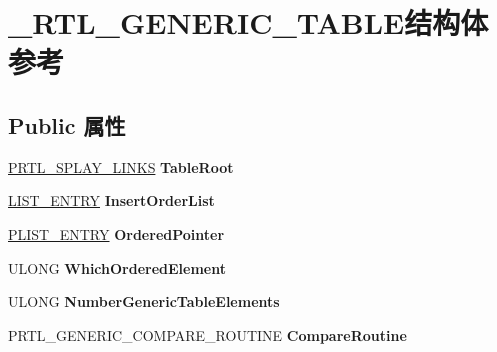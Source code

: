 \hypertarget{struct___r_t_l___g_e_n_e_r_i_c___t_a_b_l_e}{}\section{\+\_\+\+R\+T\+L\+\_\+\+G\+E\+N\+E\+R\+I\+C\+\_\+\+T\+A\+B\+L\+E结构体 参考}
\label{struct___r_t_l___g_e_n_e_r_i_c___t_a_b_l_e}
\subsection*{Public 属性}
\begin{DoxyCompactItemize}
\item 
\mbox{\label{struct___r_t_l___g_e_n_e_r_i_c___t_a_b_l_e_af8827e0071da6d9cf271bd58743c3205}} 
\hyperlink{struct___r_t_l___s_p_l_a_y___l_i_n_k_s}{P\+R\+T\+L\+\_\+\+S\+P\+L\+A\+Y\+\_\+\+L\+I\+N\+KS} {\bfseries Table\+Root}
\item 
\mbox{\label{struct___r_t_l___g_e_n_e_r_i_c___t_a_b_l_e_a890162effb44c4d0543e98eb6b174083}} 
\hyperlink{struct___l_i_s_t___e_n_t_r_y}{L\+I\+S\+T\+\_\+\+E\+N\+T\+RY} {\bfseries Insert\+Order\+List}
\item 
\mbox{\label{struct___r_t_l___g_e_n_e_r_i_c___t_a_b_l_e_a2e383d8f7035283fab6c34677c1907be}} 
\hyperlink{struct___l_i_s_t___e_n_t_r_y}{P\+L\+I\+S\+T\+\_\+\+E\+N\+T\+RY} {\bfseries Ordered\+Pointer}
\item 
\mbox{\label{struct___r_t_l___g_e_n_e_r_i_c___t_a_b_l_e_a12a67135c6242b91692e9639befa497b}} 
U\+L\+O\+NG {\bfseries Which\+Ordered\+Element}
\item 
\mbox{\label{struct___r_t_l___g_e_n_e_r_i_c___t_a_b_l_e_afa8f369d215f1347a16dbdca3ec48fee}} 
U\+L\+O\+NG {\bfseries Number\+Generic\+Table\+Elements}
\item 
\mbox{\label{struct___r_t_l___g_e_n_e_r_i_c___t_a_b_l_e_ac5ddf0b02bcf339deec794b2c0d3c757}} 
P\+R\+T\+L\+\_\+\+G\+E\+N\+E\+R\+I\+C\+\_\+\+C\+O\+M\+P\+A\+R\+E\+\_\+\+R\+O\+U\+T\+I\+NE {\bfseries Compare\+Routine}

\end{DoxyCompactItemize}
